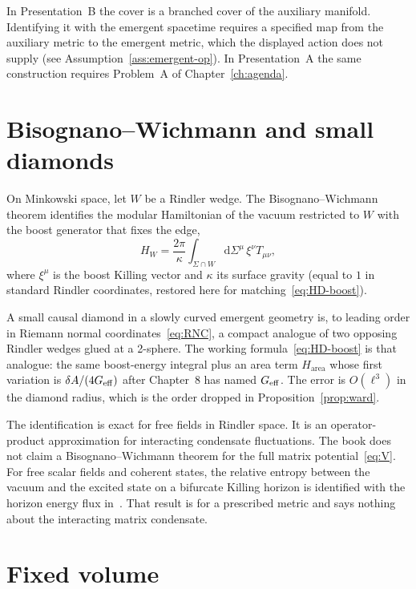 In Presentation~B the cover is a branched cover of the auxiliary
manifold. Identifying it with the emergent spacetime requires a specified
map from the auxiliary metric to the emergent metric, which the displayed
action does not supply (see Assumption~\ref{ass:emergent-op}). In
Presentation~A the same construction requires Problem~A of
Chapter~\ref{ch:agenda}.

\section{Bisognano--Wichmann and small diamonds}
\label{sec:appB-BW}

On Minkowski space, let \(W\) be a Rindler wedge. The
Bisognano--Wichmann theorem identifies the modular Hamiltonian of
the vacuum restricted to \(W\) with the boost generator that
fixes the edge,
\begin{equation}
  \label{eq:appB-BW}
  H_W
  =\frac{2\pi}{\kappa}
   \int_{\Sigma\cap W}
   \mathrm{d}\Sigma^\mu\,\xi^\nu T_{\mu\nu},
\end{equation}
where \(\xi^\mu\) is the boost Killing vector and
\(\kappa\) its surface gravity (equal to \(1\) in standard Rindler
coordinates, restored here for matching~\eqref{eq:HD-boost}).

A small causal diamond in a slowly curved emergent geometry is,
to leading order in Riemann normal coordinates~\eqref{eq:RNC}, a
compact analogue of two opposing Rindler wedges glued at a
2-sphere. The working formula~\eqref{eq:HD-boost} is that analogue:
the same boost-energy integral plus an area term
\(H_{\mathrm{area}}\) whose first variation is
\(\delta A/(4G_{\mathrm{eff}})\) after Chapter~8 has named \(G_{\mathrm{eff}}\). The
error is \(O(\ell^3)\) in the diamond radius, which is the order
dropped in Proposition~\ref{prop:ward}.

The identification is exact for free fields in Rindler space. It
is an operator-product approximation for interacting condensate
fluctuations. The book does not claim a Bisognano--Wichmann
theorem for the full matrix potential~\eqref{eq:V}. For free scalar fields and coherent states, the relative entropy
between the vacuum and the excited state on a bifurcate Killing
horizon is identified with the horizon energy flux
in~\cite{DorauMuch2026}. That result is for a prescribed metric and
says nothing about the interacting matrix condensate.

\section{Fixed volume}
\label{sec:appB-volume}

